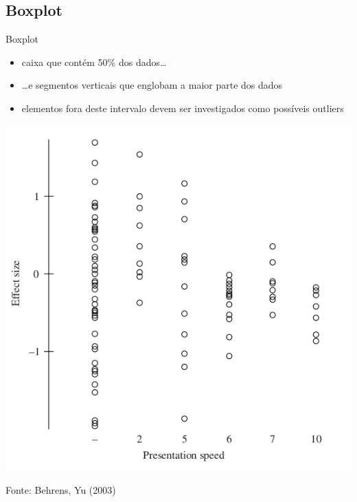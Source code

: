 \documentclass{beamer}
\begin{document}
\subsection{Boxplot}

\begin{frame}{Boxplot}
  \begin{itemize}
  \item caixa que contém 50\% dos dados\ldots
  \item \ldots e segmentos verticais que englobam a maior parte dos
    dados
  \item elementos fora deste intervalo devem ser investigados como
    possíveis outliers
  \end{itemize}
\end{frame}

\begin{frame}
  \begin{center}
    \includegraphics[height=0.7\textheight]{EDA/eda-boxplot1}
  \end{center}
  Fonte: Behrens, Yu (2003)
\end{frame}
\end{document}
